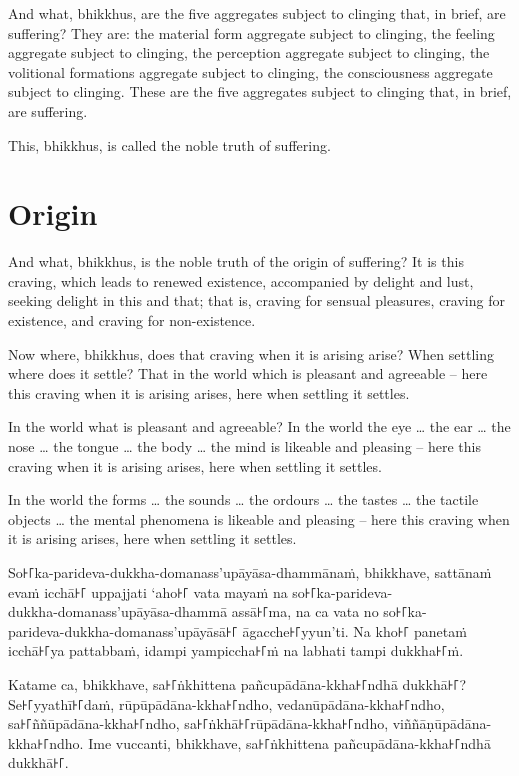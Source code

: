 And what, bhikkhus, are the five aggregates subject to clinging that, in brief,
are suffering? They are: the material form aggregate subject to clinging, the
feeling aggregate subject to clinging, the perception aggregate subject to
clinging, the volitional formations aggregate subject to clinging, the
consciousness aggregate subject to clinging. These are the five aggregates
subject to clinging that, in brief, are suffering.

This, bhikkhus, is called the noble truth of suffering.

\section{Origin}

And what, bhikkhus, is the noble truth of the origin of suffering? It is this
craving, which leads to renewed existence, accompanied by delight and lust,
seeking delight in this and that; that is, craving for sensual pleasures,
craving for existence, and craving for non-existence.

Now where, bhikkhus, does that craving when it is arising arise? When settling
where does it settle? That in the world which is pleasant and agreeable -- here
this craving when it is arising arises, here when settling it settles.

In the world what is pleasant and agreeable? In the world the eye \ldots{} the
ear \ldots{} the nose \ldots{} the tongue \ldots{} the body \ldots{} the mind is
likeable and pleasing -- here this craving when it is arising arises, here when
settling it settles.

In the world the forms \ldots{} the sounds \ldots{} the ordours \ldots{} the
tastes \ldots{} the tactile objects \ldots{} the mental phenomena is likeable
and pleasing -- here this craving when it is arising arises, here when settling
it settles.

\paliPage

So꜔꜒ka-parideva-dukkha-domanass'upāyāsa-dhammānaṁ, bhikkhave, sattānaṁ evaṁ icchā꜔꜒
uppajjati ‘aho꜔꜒ vata mayaṁ na so꜔꜒ka-parideva-\\
dukkha-domanass'upāyāsa-dhammā assā꜔꜒ma, na ca vata no so꜔꜒ka-\\
parideva-dukkha-domanass'upāyāsā꜔꜒ āgacche꜔꜒yyun’ti. Na kho꜔꜒ panetaṁ icchā꜔꜒ya
pattabbaṁ, idampi yampiccha꜔꜒ṁ na labhati tampi dukkha꜔꜒ṁ.

Katame ca, bhikkhave, sa꜔꜒ṅkhittena pañcupādāna-kkha꜔꜒ndhā dukkhā꜔꜒? Se꜔꜒yyathī꜔꜒daṁ,
rūpūpādāna-kkha꜔꜒ndho, vedanūpādāna-kkha꜔꜒ndho, sa꜔꜒ññūpādāna-kkha꜔꜒ndho,
sa꜔꜒ṅkhā꜔꜒rūpādāna-kkha꜔꜒ndho, viññāṇūpādāna-kkha꜔꜒ndho. Ime vuccanti, bhikkhave,
sa꜔꜒ṅkhittena pañcupādāna-kkha꜔꜒ndhā dukkhā꜔꜒.

